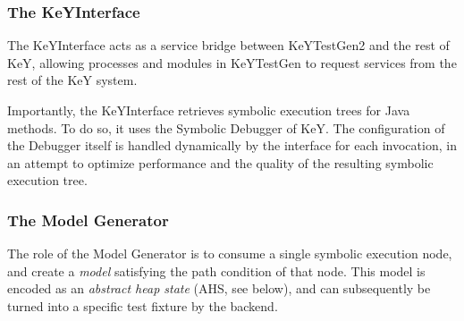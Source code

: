 \documentclass{article}
\newcommand{\tmem}[1]{{\em #1\/}}
\newenvironment{tmparmod}[3]{\begin{list}{}{\setlength{\topsep}{0pt}\setlength{\leftmargin}{#1}\setlength{\rightmargin}{#2}\setlength{\parindent}{#3}\setlength{\listparindent}{\parindent}\setlength{\itemindent}{\parindent}\setlength{\parsep}{\parskip}} \item[]}{\end{list}}
\begin{document}
\begin{center}
  
\end{center}

\begin{center}
  \begin{tmparmod}{1cm}{0pt}{0pt}
    \begin{tmparmod}{0pt}{2cm}{0pt}
      
    \end{tmparmod}
  \end{tmparmod}
\end{center}

\subsubsection{The KeYInterface}

The KeYInterface acts as a service bridge between KeYTestGen2 and the rest of
KeY, allowing processes and modules in KeYTestGen to request services from the
rest of the KeY system.



Importantly, the KeYInterface retrieves symbolic execution trees for Java
methods. To do so, it uses the Symbolic Debugger of KeY. The configuration of
the Debugger itself is handled dynamically by the interface for each
invocation, in an attempt to optimize performance and the quality of the
resulting symbolic execution tree. \



\subsubsection{The Model Generator}

The role of the Model Generator is to consume a single symbolic execution
node, and create a {\tmem{model}} satisfying the path condition of that node.
This model is encoded as an {\tmem{abstract heap state}} (AHS, see below), and
can subsequently be turned into a specific test fixture by the backend.
\end{document}

